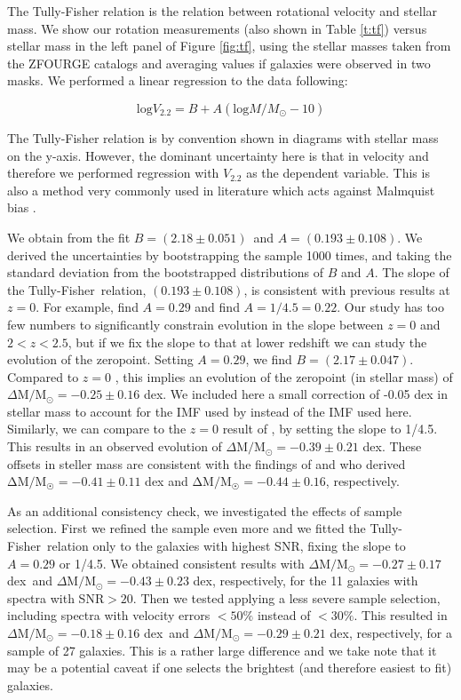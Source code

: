 \documentclass{emulateapj}
\newcommand{\msun}{$\mathrm{M_{\odot}}$}
\newcommand{\tf}{Tully-Fisher}
\newcommand{\bc}{$(2.18\pm0.051)$}%
\newcommand{\afree}{$(0.193\pm0.108)$}
\newcommand{\bfixc}{$(2.17\pm0.047)$}
\newcommand{\ev}{$\Delta \mathrm{M}/$\msun$=-0.25\pm0.16$ dex}
\newcommand{\evbell}{$\Delta \mathrm{M}/$\msun$=-0.39\pm0.21$ dex}
\newcommand{\evbright}{$\Delta \mathrm{M}/$\msun$=-0.27\pm0.17$ dex}
\newcommand{\evbrightbell}{$\Delta \mathrm{M}/$\msun$=-0.43\pm0.23$ dex}
\newcommand{\evbigsample}{$\Delta \mathrm{M}/$\msun$=-0.18\pm0.16$ dex}
\newcommand{\evbigsamplebell}{$\Delta \mathrm{M}/$\msun$=-0.29\pm0.21$ dex}
\begin{document}
The Tully-Fisher relation is the relation between rotational velocity and stellar mass. We show our rotation measurements (also shown in Table \ref{t:tf}) versus stellar mass in the left panel of Figure \ref{fig:tf}, using the stellar masses taken from the ZFOURGE catalogs {and averaging values if galaxies were observed in two masks}. {We} performed a linear regression to the data following:

\begin{equation}
\mathrm{log}V_{2.2}=B+A(\mathrm{log}M/M_{\odot}-10)
\label{eq:tf}
\end{equation}

The Tully-Fisher relation is by convention shown in diagrams with stellar mass on the y-axis. However, the dominant uncertainty here is that in velocity and therefore we performed regression with $V_{2.2}$ as the dependent variable. This is also a method very commonly used in literature which acts against Malmquist bias \citep{Bamford06,Weiner06b,Kelly07}.

We obtain from the fit $B=$\bc\ and $A=$\afree. We derived the uncertainties by bootstrapping the sample 1000 times, and taking the standard deviation from the bootstrapped distributions of $B$ and $A$. The slope of the \tf\ relation, \afree, is consistent with previous results at $z=0$. For example, \citet{Reyes11} find $A=0.29$ and \citet{Bell01} find $A=1/4.5=0.22$. Our study has too few numbers to significantly constrain evolution in the slope between $z=0$ and $2<z<2.5$, but if we fix the slope to that at lower redshift we can study the evolution of the zeropoint. Setting $A=0.29$, we find $B=$\bfixc. Compared to $z=0$ \citep{Reyes11}, this implies an evolution of the zeropoint (in stellar mass) of \ev. We included here a small correction of -0.05 dex in stellar mass to account for the \citet{Kroupa01} IMF used by \citet{Reyes11} instead of the \citet{Chabrier03} IMF used here. {Similarly, we can compare to the $z=0$ result of \citet{Bell01}, by setting the slope to 1/4.5. This results in an observed evolution of \evbell.} The{se} offset{s} in steller mass {are} consistent with the findings of \citet{Cresci09} {and \citet{Simons16}} {who} derived $\mathrm{\Delta M/M_{\Sun}}=-0.41\pm0.11$ dex{ and $\mathrm{\Delta M/M_{\Sun}}=-0.44\pm0.16$, respectively}. 

As an additional consistency check, {we investigated the effects of sample selection. First we refined the sample even more} and we fitted the \tf\ relation only to the galaxies with highest SNR, fixing the slope to $A=0.29$ {or 1/4.5}. {W}e obtained consistent result{s} with \evbright\ and {\evbrightbell, respectively,} for the {11} galaxies with spectra with SNR$>20$. Then we tested applying a less severe sample selection, including spectra with velocity errors $<50\%$ instead of $<30\%$. This resulted in \evbigsample\ {and \evbigsamplebell, respectively,} for a sample of 2{7} galaxies. This is a rather large difference and we take note that it may be a potential caveat if one selects the brightest (and therefore easiest to fit) galaxies.
\end{document}
